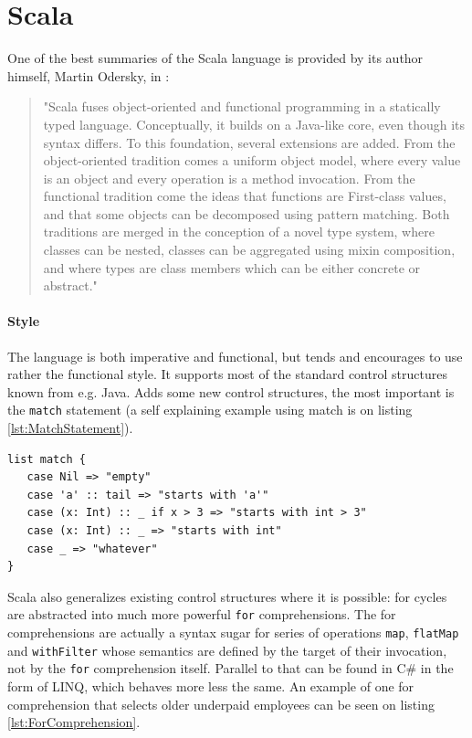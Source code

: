 \documentclass[12pt,a4paper]{report}
\begin{document}
\section{Scala}

One of the best summaries of the Scala language is provided by its author himself, Martin Odersky, in \cite{ScalableComponents}:

\begin{quote}
"Scala fuses object-oriented and functional programming in a statically typed language. Conceptually, it builds on a Java-like core, even though its syntax differs. To this foundation, several extensions are added. From the object-oriented tradition comes a uniform object model, where every value is an object and every operation is a method invocation. From the functional tradition come the ideas that functions are First-class values, and that some objects can be decomposed using pattern matching. Both traditions are merged in the conception of a novel type system, where classes can be nested, classes can be aggregated using mixin composition, and where types are class members which can be either concrete or abstract."
\end{quote}

\paragraph{Style} The language is both imperative and functional, but tends and encourages to use rather the functional style. It supports most of the standard control structures known from e.g. Java. Adds some new control structures, the most important is the \texttt{match} statement (a self explaining example using match is on listing \ref{lst:MatchStatement}).

\begin{lstlisting}[caption={Match statement example.},label={lst:MatchStatement}]
list match {
   case Nil => "empty"
   case 'a' :: tail => "starts with 'a'"
   case (x: Int) :: _ if x > 3 => "starts with int > 3"
   case (x: Int) :: _ => "starts with int"
   case _ => "whatever"
}
\end{lstlisting}

Scala also generalizes existing control structures where it is possible: for cycles are abstracted into much more powerful \texttt{for} comprehensions. The for comprehensions are actually a syntax sugar for series of operations \texttt{map}, \texttt{flatMap} and \texttt{withFilter} whose semantics are defined by the target of their invocation, not by the \texttt{for} comprehension itself. Parallel to that can be found in C\# in the form of LINQ\cite{Linq}, which behaves more less the same. An example of one for comprehension that selects older underpaid employees can be seen on listing \ref{lst:ForComprehension}.
\end{document}
